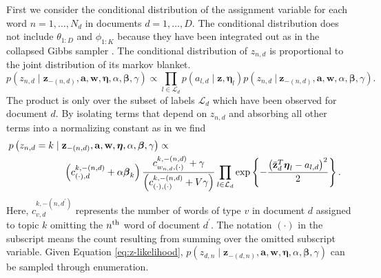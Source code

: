 First we consider the conditional distribution of the assignment variable
for each word $n=1,\ldots,N_{d}$ in documents $d=1,\ldots,D$. The
conditional distribution does not include $\theta_{1:D}$ and $\phi_{1:K}$
because they have been integrated out as in the collapsed Gibbs sampler
\citep{Griffiths04}. The conditional distribution of $z_{n,d}$ is
proportional to the joint distribution of its markov blanket. %
\begin{equation}
p\left(z_{n,d}\mid\mathbf{z}_{-\left(n,d\right)},\mathbf{a},\mathbf{w},\mathbf{\boldsymbol\eta},\alpha,\boldsymbol\beta,\gamma\right)\propto\prod_{l\in\mathcal{L}_{d}}p\left(a_{l,d}\mid\mathbf{z},\boldsymbol\eta_{l}\right)p\left(z_{n,d}\ |\ \mathbf{z}_{-\left(n,d\right)},\mathbf{a},\mathbf{w},\alpha,\boldsymbol\beta,\gamma\right).\end{equation}
 The product is only over the subset of labels $\mathcal{L}_{d}$
which have been observed for document $d$. By isolating terms that
depend on $z_{n,d}$ and absorbing all other terms into a normalizing
constant as in \citep{Griffiths04} we find 
\begin{eqnarray}
\lefteqn{p\left(z_{n,d}=k\mid\mathbf{z}_{-\left(n,d\right)},\mathbf{a},\mathbf{w},\mathbf{\boldsymbol\eta},\alpha,\boldsymbol\beta,\gamma\right)\propto}\nonumber \\
 & \hspace{2cm}\left(c_{\left(\cdot\right),d}^{k,-\left(n,d\right)}+\alpha\boldsymbol\beta_{k}\right)\frac{c_{w_{n,d},\left(\cdot\right)}^{k,-\left(n,d\right)}+\gamma}{\left(c_{\left(\cdot\right),\left(\cdot\right)}^{k,-\left(n,d\right)}+V\gamma\right)}\prod_{l\in\mathcal{L}_{d}}\exp\left\{ -\frac{\left(\bar{\mathbf{z}}_{d}^{T}\boldsymbol\eta_{l}-a_{l,d}\right)^{2}}{2}\right\} .\label{eq:z-likelihood}\end{eqnarray}
 Here, $c_{v,d}^{k,-\left(n,d^{\prime}\right)}$ represents the number
of words of type $v$ in document $d$ assigned to topic $k$ omitting
the $n^{{\rm th}}$ word of document $d^{\prime}$. The notation $(\cdot)$
in the subscript means the count resulting from summing over the omitted
subscript variable. Given Equation \ref{eq:z-likelihood}, $p\left(z_{d,n}\mid\mathbf{z}_{-\left(d,n\right)},\mathbf{a},\mathbf{w},\mathbf{\boldsymbol\eta},\alpha,\boldsymbol\beta,\gamma\right)$
can be sampled through enumeration. 


